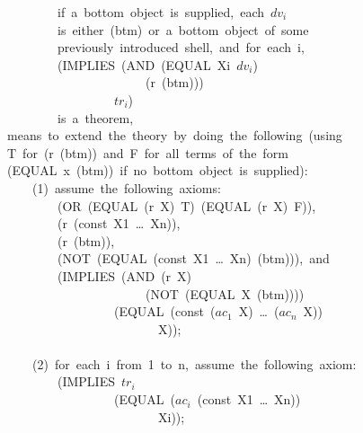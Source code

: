 \documentclass[10pt]{book}
\newenvironment{pubasis}{\begin{flushleft}}{\end{flushleft}}
\begin{document}
\begin{pubasis}
~~~~~~~~~~~~~~~~if~a~bottom~object~is~supplied,~each~$dv_{i}$\\
~~~~~~~~~~~~~~~~is~either~(btm)~or~a~bottom~object~of~some\\
~~~~~~~~~~~~~~~~previously~introduced~shell,~and~for~each~i,\\

~~~~~~~~~~~~~~~~(IMPLIES~(AND~(EQUAL~Xi~$dv_{i}$)\\
~~~~~~~~~~~~~~~~~~~~~~~~~~~~~~(r~(btm)))\\
~~~~~~~~~~~~~~~~~~~~~~~~~$tr_{i}$)\\

~~~~~~~~~~~~~~~~is~a~theorem,\\

~~~~~~~~means~to~extend~the~theory~by~doing~the~following~(using\\
~~~~~~~~T~for~(r~(btm))~and~F~for~all~terms~of~the~form\\
~~~~~~~~(EQUAL~x~(btm))~if~no~bottom~object~is~supplied):\\

~~~~~~~~~~~~(1)~assume~the~following~axioms:\\

~~~~~~~~~~~~~~~~(OR~(EQUAL~(r~X)~T)~(EQUAL~(r~X)~F)),\\

~~~~~~~~~~~~~~~~(r~(const~X1~\ldots{}~Xn)),\\

~~~~~~~~~~~~~~~~(r~(btm)),\\

~~~~~~~~~~~~~~~~(NOT~(EQUAL~(const~X1~\ldots{}~Xn)~(btm))),~and\\

~~~~~~~~~~~~~~~~(IMPLIES~(AND~(r~X)\\
~~~~~~~~~~~~~~~~~~~~~~~~~~~~~~(NOT~(EQUAL~X~(btm))))\\
~~~~~~~~~~~~~~~~~~~~~~~~~(EQUAL~(const~($ac_{1}$~X)~\ldots{}~($ac_{n}$~X))\\
~~~~~~~~~~~~~~~~~~~~~~~~~~~~~~~~X));\\

~~~~~~~~~~~~~~~~\\
~~~~~~~~~~~~(2)~for~each~i~from~1~to~n,~assume~the~following~axiom:\\

~~~~~~~~~~~~~~~~(IMPLIES~$tr_{i}$\\
~~~~~~~~~~~~~~~~~~~~~~~~~(EQUAL~($ac_{i}$~(const~X1~\ldots{}~Xn))\\
~~~~~~~~~~~~~~~~~~~~~~~~~~~~~~~~Xi));\\


\end{pubasis}
\end{document}
